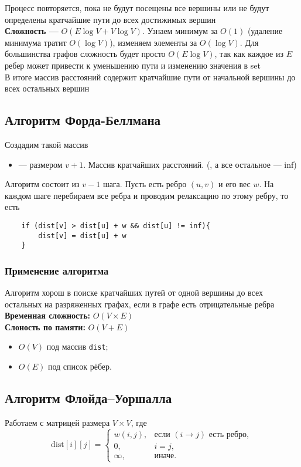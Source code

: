 \documentclass[a4paper]{article}
\begin{document}
\indent Процесс повторяется, пока не будут посещены все вершины или не будут определены кратчайшие пути до всех достижимых вершин\\[2mm]
\indent \textbf{Сложность —} $O(E\log{V} + V\log{V})$. Узнаем минимум за $O(1)$ (удаление минимума тратит $O(\log{V})$), изменяем элементы за $O(\log{V})$. Для большинства графов сложность будет просто $O(E\log{V})$, так как каждое из $E$ ребер может привести к уменьшению пути и изменению значения в set\\[2mm]
\indent В итоге массив расстояний содержит кратчайшие пути от начальной вершины до всех остальных вершин


\subsection{Алгоритм Форда-Беллмана}
Создадим такой массив
\begin{itemize}
    \item {} — размером $v+1$. Массив кратчайших расстояний. (, а все остальное — inf)
\end{itemize}
Алгоритм состоит из $v-1$ шага. Пусть есть ребро $(u,v)$ и его вес $w$. На каждом шаге перебираем все ребра и проводим релаксацию по этому ребру, то есть
\begin{lstlisting}
    if (dist[v] > dist[u] + w && dist[u] != inf){
        dist[v] = dist[u] + w
    }
\end{lstlisting}
\subsubsection*{Применение алгоритма}
Алгоритм хорош в поиске кратчайших путей от одной вершины до всех остальных на разряженных графах, если в графе есть отрицательные ребра\\[2mm]
\textbf{Временная сложность:} $O(V \times E)$\\[2mm]
\textbf{Слоность по памяти:} $O(V + E)$ 
\begin{itemize}
  \item $O(V)$ под массив \texttt{dist};
  \item $O(E)$ под список рёбер.
\end{itemize}


\subsection{Алгоритм Флойда–Уоршалла}
Работаем с матрицей размера $V\times V$, где
\[
  \mathrm{dist}[i][j] =
    \begin{cases}
      w(i,j), & \text{если }(i\to j)\text{ есть ребро},\\
      0,      & i=j,\\
      \infty,& \text{иначе}.
    \end{cases}
\]
\end{document}
